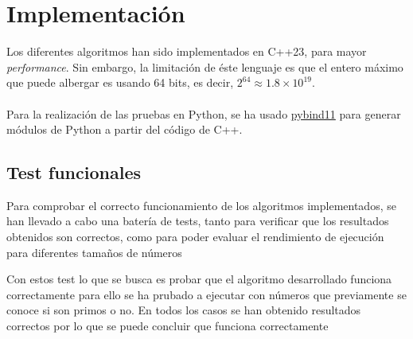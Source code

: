 \section{Implementación}

Los diferentes algoritmos han sido implementados en C++23, para mayor \textit{performance}. Sin embargo, la limitación de éste lenguaje es que el entero máximo que puede albergar es usando 64 bits, es decir, $2^64 \approx 1.8 \times 10^19$.\\
\\
Para la realización de las pruebas en Python, se ha usado \href{https://github.com/pybind/pybind11}{pybind11} para generar módulos de Python a partir del código de C++.

\subsection{Test funcionales}
Para comprobar el correcto funcionamiento de los algoritmos implementados, se han llevado a cabo una batería de tests, tanto para verificar que los resultados obtenidos son correctos, como para poder evaluar el rendimiento de ejecución para diferentes tamaños de números

Con estos test lo que se busca es probar que el algoritmo desarrollado funciona correctamente para ello se ha prubado a ejecutar con números que previamente se conoce si son primos o no. En todos los casos se han obtenido resultados correctos por lo que se puede concluir que funciona correctamente
\begin{figure}[H]
\end{figure}

